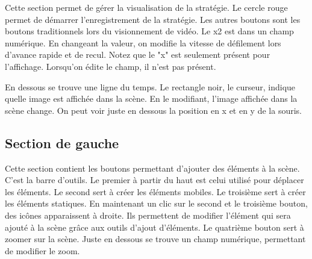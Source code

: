 Cette section permet de gérer la visualisation de la stratégie. Le cercle rouge permet de démarrer l'enregistrement de la stratégie. Les autres boutons sont les boutons traditionnels lors du visionnement de vidéo. Le x2 est dans un champ numérique. En changeant la valeur, on modifie la vitesse de défilement lors d'avance rapide et de recul. Notez que le "x" est seulement présent pour l'affichage. Lorsqu'on édite le champ, il n'est pas présent.


En dessous se trouve une ligne du temps. Le rectangle noir, le curseur, indique quelle image est affichée dans la scène. En le modifiant, l'image affichée dans la scène change. On peut voir juste en dessous la position en x et en y de la souris.

\subsection{Section de gauche}

Cette section contient les boutons permettant d'ajouter des éléments à la scène. C'est la barre d'outils. Le premier à partir du haut est celui utilisé pour déplacer les éléments. Le second sert à créer les éléments mobiles. Le troisième sert à créer les éléments statiques. En maintenant un clic sur le second et le troisième bouton, des icônes apparaissent à droite. Ils permettent de modifier l'élément qui sera ajouté à la scène grâce aux outils d'ajout d'éléments. Le quatrième bouton sert à zoomer sur la scène. Juste en dessous se trouve un champ numérique, permettant de modifier le zoom. 
